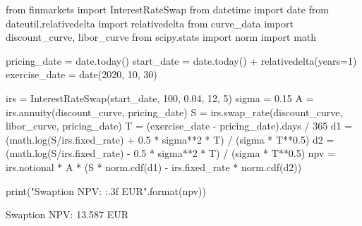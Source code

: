 \cprotEnv\begin{solution}
\begin{ipython}
from finmarkets import InterestRateSwap
from datetime import date
from dateutil.relativedelta import relativedelta
from curve_data import discount_curve, libor_curve
from scipy.stats import norm
import math

pricing_date = date.today()
start_date = date.today() + relativedelta(years=1)
exercise_date = date(2020, 10, 30)

irs = InterestRateSwap(start_date, 100, 0.04, 12, 5)
sigma = 0.15
A = irs.annuity(discount_curve, pricing_date)
S = irs.swap_rate(discount_curve, libor_curve, pricing_date)
T = (exercise_date - pricing_date).days / 365
d1 = (math.log(S/irs.fixed_rate) + 0.5 * sigma**2 * T) / (sigma * T**0.5)
d2 = (math.log(S/irs.fixed_rate) - 0.5 * sigma**2 * T) / (sigma * T**0.5)
npv = irs.notional * A * (S * norm.cdf(d1) - irs.fixed_rate * norm.cdf(d2))

print("Swaption NPV: {:.3f} EUR".format(npv))
\end{ipython}
\begin{ioutput}
Swaption NPV: 13.587 EUR
\end{ioutput}
\end{solution}
